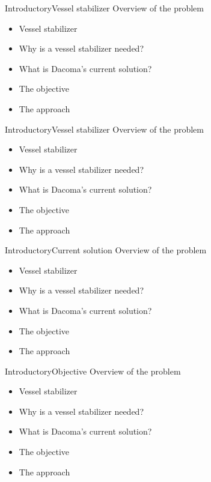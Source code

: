 \documentclass[aspectratio=169,10pt,t]{beamer}
\begin{document}
\begin{frame}{Introductory}{Vessel stabilizer\vphantom{(y}}
\vspace{-0.7em}
Overview of the problem
\begin{itemize}
\item {\color{blue}Vessel stabilizer}
\item Why is a vessel stabilizer needed?
\item What is Dacoma's current solution?
\item The objective
\item The approach
\end{itemize}
\end{frame}

\begin{frame}{Introductory}{Vessel stabilizer\vphantom{(y}}
\vspace{-0.7em}
Overview of the problem
\begin{itemize}
\item Vessel stabilizer
\item {\color{blue}Why is a vessel stabilizer needed?}
\item What is Dacoma's current solution?
\item The objective
\item The approach
\end{itemize}
\end{frame}

\begin{frame}{Introductory}{Current solution\vphantom{(y}}
\vspace{-0.7em}
Overview of the problem
\begin{itemize}
\item Vessel stabilizer
\item Why is a vessel stabilizer needed?
\item {\color{blue}What is Dacoma's current solution?}
\item The objective
\item The approach
\end{itemize}
\end{frame}

\begin{frame}{Introductory}{Objective\vphantom{(y}}
\vspace{-0.7em}
Overview of the problem
\begin{itemize}
\item Vessel stabilizer
\item Why is a vessel stabilizer needed?
\item What is Dacoma's current solution?
\item {\color{blue}The objective}
\item The approach
\end{itemize}
\end{frame}
\end{document}
